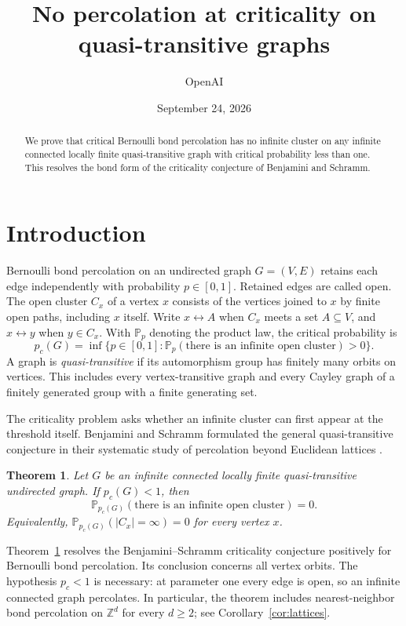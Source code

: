 \documentclass[11pt]{article}
\title{No percolation at criticality on quasi-transitive graphs}
\author{OpenAI}
\date{September 24, 2026}
\newtheorem{theorem}{Theorem}[section]
\theoremstyle{definition}
\newcommand{\PP}{\mathbb P}
\newcommand{\pc}{p_c}
\newcommand{\Z}{\mathbb Z}
\begin{document}
\maketitle
\begin{abstract}
We prove that critical Bernoulli bond percolation has no infinite
cluster on any infinite connected locally finite quasi-transitive graph
with critical probability less than one. This resolves the bond form of
the criticality conjecture of Benjamini and Schramm.
\end{abstract}
\tableofcontents
\section{Introduction}
\label{sec:introduction}

Bernoulli bond percolation on an undirected graph $G=(V,E)$ retains
each edge independently with probability $p\in[0,1]$. Retained edges
are called open. The open cluster $C_x$ of a vertex $x$ consists of the
vertices joined to $x$ by finite open paths, including $x$ itself. Write
$x\leftrightarrow A$ when $C_x$ meets a set $A\subseteq V$, and
$x\leftrightarrow y$ when $y\in C_x$. With $\PP_p$ denoting the product
law, the critical probability is
\[
 \pc(G)=\inf\{p\in[0,1]:
       \PP_p(\text{there is an infinite open cluster})>0\}.
\]
A graph is \emph{quasi-transitive} if its automorphism group has finitely
many orbits on vertices. This includes every vertex-transitive graph
and every Cayley graph of a finitely generated group with a finite
generating set.

The criticality problem asks whether an infinite cluster can first
appear at the threshold itself. Benjamini and Schramm formulated the
general quasi-transitive conjecture in their systematic study of
percolation beyond Euclidean lattices
\cite[Conjecture~4]{BenjaminiSchramm1996}.

\begin{theorem}
\label{thm:main}
Let $G$ be an infinite connected locally finite quasi-transitive
undirected graph. If $\pc(G)<1$, then
\[
 \PP_{\pc(G)}(\text{there is an infinite open cluster})=0.
\]
Equivalently, $\PP_{\pc(G)}(|C_x|=\infty)=0$ for every vertex $x$.
\end{theorem}

Theorem~\ref{thm:main} resolves the Benjamini--Schramm criticality
conjecture positively for Bernoulli bond percolation. Its conclusion
concerns all vertex orbits.
The hypothesis $\pc<1$ is necessary: at parameter one every edge is
open, so an infinite connected graph percolates.
In particular, the theorem includes nearest-neighbor bond percolation on
$\Z^d$ for every $d\ge2$; see Corollary~\ref{cor:lattices}.
\end{document}
